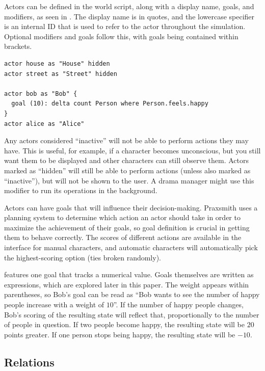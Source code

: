 Actors can be defined in the world script, along with a display name, goals, and modifiers,
as seen in . The display name is in quotes, and the lowercase specifier
is an internal ID that is used to refer to the actor throughout the simulation. Optional
modifiers and goals follow this, with goals being contained within brackets.

\begin{lstlisting}[float=hb, caption=Examples of instantiating agents into the world., label=lst:ActorDef]
actor house as "House" hidden
actor street as "Street" hidden

actor bob as "Bob" {
  goal (10): delta count Person where Person.feels.happy
}
actor alice as "Alice"
\end{lstlisting}

Any actors considered ``inactive'' will not be able to perform actions they may have.
This is useful, for example, if a character becomes unconscious, but you still
want them to be displayed and other characters can still observe them. Actors marked
as ``hidden'' will still be able to perform actions (unless also marked as ``inactive''),
but will not be shown to the user. A drama manager might use this modifier to run its
operations in the background.

Actors can have goals that will influence their decision-making. Praxsmith uses a
planning system to determine which action an actor should take in order to maximize
the achievement of their goals, so goal definition is crucial in getting them to
behave correctly. The scores of different actions are available in the interface
for manual characters, and automatic characters will automatically pick the highest-scoring
option (ties broken randomly).

 features one goal that tracks a numerical
value. Goals themselves are written as expressions, which are explored later in
this paper. The weight appears within parentheses, so Bob's goal can be read as
``Bob wants to see the number of happy people increase with a weight of $10$''.
If the number of happy people changes, Bob's scoring of the resulting state
will reflect that, proportionally to the number of people in question. If two
people become happy, the resulting state will be $20$ points greater. If one
person stops being happy, the resulting state will be $-10$.

\subsection{Relations}

